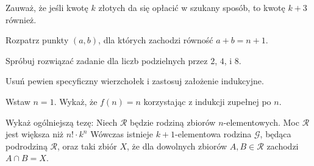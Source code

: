 
\begin{hints_list}
	\item Zauważ, że jeśli kwotę $k$ złotych da się opłacić w szukany sposób, to kwotę $k + 3$ również.
	\item Rozpatrz punkty $(a, b)$, dla których zachodzi równość $a + b = n + 1$.
	\item Spróbuj rozwiązać zadanie dla liczb podzielnych przez $2$, $4$, i $8$.
	\item Usuń pewien specyficzny wierzchołek i zastosuj założenie indukcyjne.
	\item Wstaw $n = 1$. Wykaż, że $f(n) = n$ korzystając z indukcji zupełnej po $n$.
	\item Wykaż ogólniejszą tezę:
	Niech $\mathcal{R}$ będzie rodziną zbiorów $n$-elementowych. Moc $\mathcal{R}$ jest większa niż $n! \cdot k^{n}$ Wówczas istnieje $k+1$-elementowa rodzina $\mathcal{G}$, będąca podrodziną $\mathcal{R}$, oraz taki zbiór $X$, że dla dowolnych zbiorów $A, B \in \mathcal{R}$ zachodzi $A \cap B = X$.
\end{hints_list}